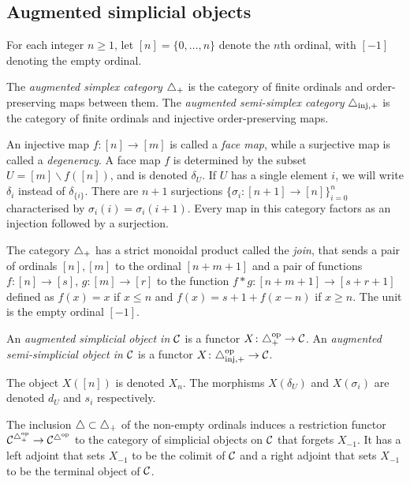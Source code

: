 \subsection{Augmented simplicial objects} For each integer $n\geq 1$, let $[n] = \{0,\ldots,n\}$ denote the $n$th ordinal, with $[-1]$ denoting the empty ordinal.
\begin{definition}
    The \emph{augmented simplex category} $\triangle_{+}$ is the category of finite ordinals and order-preserving maps between them. The \emph{augmented semi-simplex category} $\triangle_{\mathrm{inj},+}$ is the category of finite ordinals and injective order-preserving maps.
\end{definition}

An injective map $f\colon [n]\to [m]$ is called a \emph{face map}, while a surjective map is called a \emph{degeneracy}. A face map $f$ is determined by the subset $U = [m]\smallsetminus f([n])$, and is denoted $\delta_U$. If $U$ has a single element $i$, we will write $\delta_i$ instead of $\delta_{\{i\}}$. There are $n+1$ surjections $\{\sigma_i\colon [n+1]\to [n]\}_{i=0}^n$ characterised by $\sigma_i(i) = \sigma_i(i+1)$. Every map in this category factors as an injection followed by a surjection. 


The category $\triangle_+$ has a strict monoidal product called the \emph{join}, that sends a pair of ordinals $[n],[m]$ to the ordinal $[n+m+1]$ and a pair of functions $f\colon [n]\to [s]$, $g\colon [m]\to [r]$ to the function $f*g\colon [n+m+1]\to [s+r+1]$ defined as $f(x) = x$ if $x\leq  n$ and $f(x) = s+1+f(x-n)$ if $x\geq n$. The unit is the empty ordinal $[-1]$.


\begin{definition}
    An \emph{augmented simplicial object in $\mathcal{C}$} is a functor $X\colon \triangle_{+}^\mathrm{op}\to \mathcal{C}$. An \emph{augmented semi-simplicial object in $\mathcal{C}$} is a functor $X\colon \triangle_{\mathrm{inj},+}^\mathrm{op}\to \mathcal{C}$.
\end{definition}

The object $X([n])$ is denoted $X_n$. The morphisms $X(\delta_U)$ and $X(\sigma_i)$ are denoted $d_U$ and $s_i$ respectively.

The inclusion $\triangle\subset \triangle_{+}$ of the non-empty ordinals induces a restriction functor $\mathcal{C}^{\triangle_{+}^{{\mathrm{op}}}}\to \mathcal{C}^{\triangle^{{\mathrm{op}}}}$ to the category of simplicial objects on $\mathcal{C}$ that forgets $X_{-1}$. It has a left adjoint that sets $X_{-1}$ to be the colimit of $\mathcal{C}$ and a right adjoint that sets $X_{-1}$ to be the terminal object of $\mathcal{C}$. 


